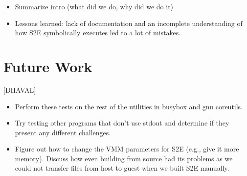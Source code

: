 \documentclass[conference]{IEEEtran}
\begin{document}
\begin{itemize}
	\item Summarize intro (what did we do, why did we do it)
  \item Lessons learned: lack of documentation and an incomplete understanding of how S2E symbolically executes led to a lot of mistakes.
\end{itemize}


\section{Future Work}

[DHAVAL]

\begin{itemize}
  \item Perform these tests on the rest of the utilities in busybox and gnu coreutils.
  \item Try testing other programs that don't use stdout and determine if they present any different challenges.
  \item Figure out how to change the VMM parameters for S2E (e.g., give it more memory). Discuss how even building from source had its problems as we could not transfer files from host to guest when we built S2E manually.
\end{itemize}

\end{document}
